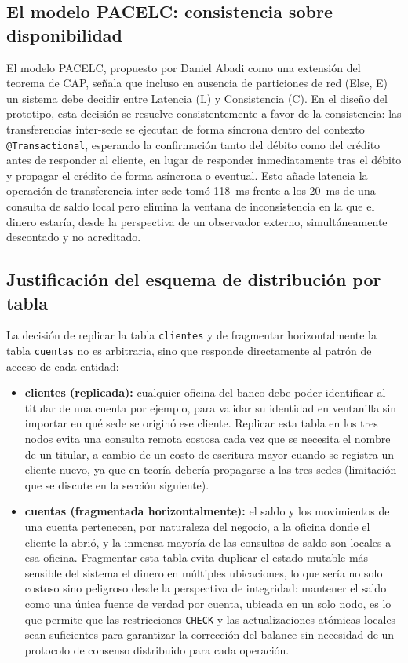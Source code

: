 \documentclass[11pt,a4paper]{article}
\begin{document}
\subsection{El modelo PACELC: consistencia sobre disponibilidad}
El modelo PACELC, propuesto por Daniel Abadi como una extensión del teorema de CAP, señala que incluso en ausencia de particiones de red (Else, E) un sistema debe decidir entre Latencia (L) y Consistencia (C). En el diseño del prototipo, esta decisión se resuelve consistentemente a favor de la consistencia: las transferencias inter-sede se ejecutan de forma síncrona dentro del contexto \texttt{@Transactional}, esperando la confirmación tanto del débito como del crédito antes de responder al cliente, en lugar de responder inmediatamente tras el débito y propagar el crédito de forma asíncrona o eventual. Esto añade latencia la operación de transferencia inter-sede tomó 118~ms frente a los 20~ms de una consulta de saldo local pero elimina la ventana de inconsistencia en la que el dinero estaría, desde la perspectiva de un observador externo, simultáneamente descontado y no acreditado.

\subsection{Justificación del esquema de distribución por tabla}
La decisión de replicar la tabla \texttt{clientes} y de fragmentar horizontalmente la tabla \texttt{cuentas} no es arbitraria, sino que responde directamente al patrón de acceso de cada entidad:

\begin{itemize}[leftmargin=1.2em]
  \item \textbf{clientes (replicada):} cualquier oficina del banco debe poder identificar al titular de una cuenta por ejemplo, para validar su identidad en ventanilla sin importar en qué sede se originó ese cliente. Replicar esta tabla en los tres nodos evita una consulta remota costosa cada vez que se necesita el nombre de un titular, a cambio de un costo de escritura mayor cuando se registra un cliente nuevo, ya que en teoría debería propagarse a las tres sedes (limitación que se discute en la sección siguiente).
  \item \textbf{cuentas (fragmentada horizontalmente):} el saldo y los movimientos de una cuenta pertenecen, por naturaleza del negocio, a la oficina donde el cliente la abrió, y la inmensa mayoría de las consultas de saldo son locales a esa oficina. Fragmentar esta tabla evita duplicar el estado mutable más sensible del sistema el dinero en múltiples ubicaciones, lo que sería no solo costoso sino peligroso desde la perspectiva de integridad: mantener el saldo como una única fuente de verdad por cuenta, ubicada en un solo nodo, es lo que permite que las restricciones \texttt{CHECK} y las actualizaciones atómicas locales sean suficientes para garantizar la corrección del balance sin necesidad de un protocolo de consenso distribuido para cada operación.
\end{itemize}
\end{document}
